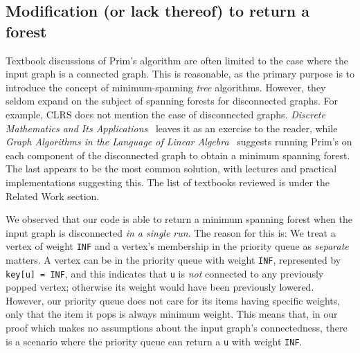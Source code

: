 \subsection{Modification (or lack thereof) to return a forest}

Textbook discussions of Prim's algorithm are often limited to the case where the input graph is a connected graph. This is reasonable, as the primary purpose is to introduce the concept of minimum-spanning \textit{tree} algorithms. However, they seldom expand on the subject of spanning forests for disconnected graphs. For example, CLRS does not mention the case of disconnected graphs. \textit{Discrete Mathematics and Its Applications}~\cite{rozen} leaves it as an exercise to the reader, while \textit{Graph Algorithms in the Language of Linear Algebra}~\cite{kepnergilbert} suggests running Prim's on each component of the disconnected graph to obtain a minimum spanning forest. The last appears to be the most common solution, with lectures and practical implementations suggesting this. The list of textbooks reviewed is under the Related Work section.

We observed that our code is able to return a minimum spanning forest when the input graph is disconnected \textit{in a single run}. The reason for this is: We treat a vertex of weight \texttt{INF} and a vertex's membership in the priority queue as \textit{separate} matters. A vertex can be in the priority queue with weight \texttt{INF}, represented by \texttt{key[u] = INF}, and this indicates that \texttt{u} is \textit{not} connected to any previously popped vertex; otherwise its weight would have been previously lowered. However, our priority queue does not care for its items having specific weights, only that the item it pops is always minimum weight. This means that, in our proof which makes no assumptions about the input graph's connectedness, there is a scenario where the priority queue can return a \texttt{u} with weight \texttt{INF}.

